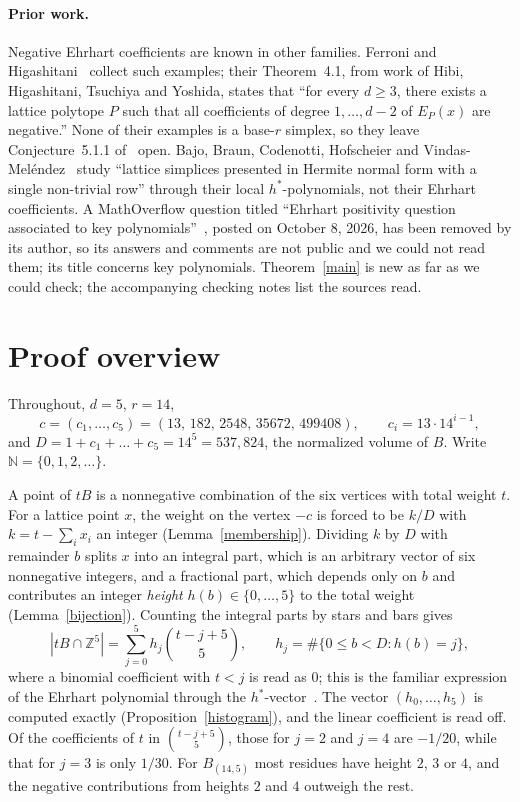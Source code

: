 \documentclass[11pt]{article}
\theoremstyle{remark}
\newcommand{\ZZ}{\mathbb{Z}}
\newcommand{\NN}{\mathbb{N}}
\begin{document}
\paragraph{Prior work.} Negative Ehrhart coefficients are known in other families. Ferroni and Higashitani~\cite[Section~4.1]{FH} collect such examples; their Theorem~4.1, from work of Hibi, Higashitani, Tsuchiya and Yoshida, states that ``for every $d\ge3$, there exists a lattice polytope $P$ such that all coefficients of degree $1,\dots,d-2$ of $E_P(x)$ are negative.'' None of their examples is a base-$r$ simplex, so they leave Conjecture~5.1.1 of~\cite{Liu} open. Bajo, Braun, Codenotti, Hofscheier and Vindas-Mel\'endez~\cite{Bajo} study ``lattice simplices presented in Hermite normal form with a single non-trivial row'' through their local $h^*$-polynomials, not their Ehrhart coefficients. A MathOverflow question titled ``Ehrhart positivity question associated to key polynomials''~\cite{MO}, posted on October 8, 2026, has been removed by its author, so its answers and comments are not public and we could not read them; its title concerns key polynomials. Theorem~\ref{main} is new as far as we could check; the accompanying checking notes list the sources read.

\section{Proof overview}
Throughout, $d=5$, $r=14$,
\[
c=(c_1,\dots,c_5)=(13,\,182,\,2548,\,35672,\,499408),\qquad c_i=13\cdot14^{i-1},
\]
and $D=1+c_1+\dots+c_5=14^5=537{,}824$, the normalized volume of $B$. Write $\NN=\{0,1,2,\dots\}$.

A point of $tB$ is a nonnegative combination of the six vertices with total weight $t$. For a lattice point $x$, the weight on the vertex $-c$ is forced to be $k/D$ with $k=t-\sum_ix_i$ an integer (Lemma~\ref{membership}). Dividing $k$ by $D$ with remainder $b$ splits $x$ into an integral part, which is an arbitrary vector of six nonnegative integers, and a fractional part, which depends only on $b$ and contributes an integer \emph{height} $h(b)\in\{0,\dots,5\}$ to the total weight (Lemma~\ref{bijection}). Counting the integral parts by stars and bars gives
\[
|tB\cap\ZZ^5|=\sum_{j=0}^{5} h_j\binom{t-j+5}{5},\qquad h_j=\#\{0\le b<D: h(b)=j\},
\]
where a binomial coefficient with $t<j$ is read as $0$; this is the familiar expression of the Ehrhart polynomial through the $h^*$-vector~\cite[(1.1)]{Liu}. The vector $(h_0,\dots,h_5)$ is computed exactly (Proposition~\ref{histogram}), and the linear coefficient is read off. Of the coefficients of $t$ in $\binom{t-j+5}{5}$, those for $j=2$ and $j=4$ are $-1/20$, while that for $j=3$ is only $1/30$. For $B_{(14,5)}$ most residues have height $2$, $3$ or $4$, and the negative contributions from heights $2$ and $4$ outweigh the rest.
\end{document}
